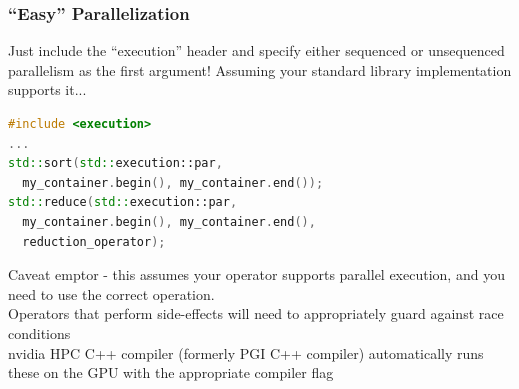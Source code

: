 \documentclass{beamer}
\begin{document}
\begin{frame}[fragile]
  \frametitle{``Easy'' Parallelization}
  Just include the ``execution'' header and specify either sequenced or unsequenced parallelism
  as the first argument!
  Assuming your standard library implementation supports it...
  \begin{lstlisting}[language=C++]
#include <execution>
...
std::sort(std::execution::par,
  my_container.begin(), my_container.end());
std::reduce(std::execution::par,
  my_container.begin(), my_container.end(),
  reduction_operator);
  \end{lstlisting}
  Caveat emptor - this assumes your operator supports parallel execution, and you need to use the correct operation.\\
  Operators that perform side-effects will need to appropriately guard against race conditions\\
  nvidia HPC C++ compiler (formerly PGI C++ compiler) automatically runs these on the GPU with the appropriate compiler flag
\end{frame}

\end{document}

